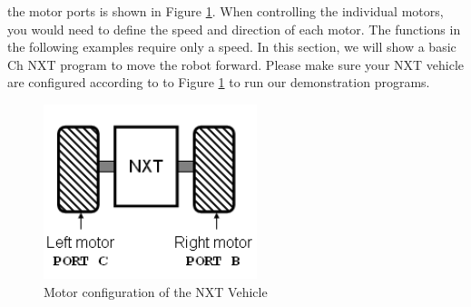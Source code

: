 the motor ports is shown in Figure \ref{fig_NXT_vehport}. When controlling the individual motors, you
would need to define the speed and direction of each motor.  The functions in the following examples 
require only a speed. In this section, we will show a basic Ch NXT program to move the robot forward.
Please make sure your NXT vehicle are configured according to to Figure \ref{fig_NXT_vehport} to run 
our demonstration programs.\\
\begin{figure}[h]
  \begin{center}
    \includegraphics[height=2in]{figure/mindstorm/Vehicle.png}
    \caption{Motor configuration of the NXT Vehicle \label{fig_NXT_vehport}}
  \end{center}
\end{figure}

%

